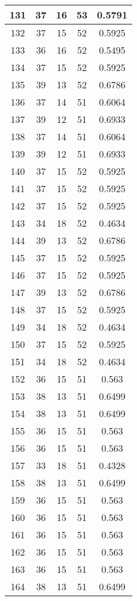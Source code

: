 \documentclass[letterpaper, 12pt]{article}
\begin{document}
\begin{longtable}{|c|c|c|c|c|}
\hline
131 & 37 & 16 & 53 & 0.5791 \\
\hline
132 & 37 & 15 & 52 & 0.5925 \\
\hline
133 & 36 & 16 & 52 & 0.5495 \\
\hline
134 & 37 & 15 & 52 & 0.5925 \\
\hline
135 & 39 & 13 & 52 & 0.6786 \\
\hline
136 & 37 & 14 & 51 & 0.6064 \\
\hline
137 & 39 & 12 & 51 & 0.6933 \\
\hline
138 & 37 & 14 & 51 & 0.6064 \\
\hline
139 & 39 & 12 & 51 & 0.6933 \\
\hline
140 & 37 & 15 & 52 & 0.5925 \\
\hline
141 & 37 & 15 & 52 & 0.5925 \\
\hline
142 & 37 & 15 & 52 & 0.5925 \\
\hline
143 & 34 & 18 & 52 & 0.4634 \\
\hline
144 & 39 & 13 & 52 & 0.6786 \\
\hline
145 & 37 & 15 & 52 & 0.5925 \\
\hline
146 & 37 & 15 & 52 & 0.5925 \\
\hline
147 & 39 & 13 & 52 & 0.6786 \\
\hline
148 & 37 & 15 & 52 & 0.5925 \\
\hline
149 & 34 & 18 & 52 & 0.4634 \\
\hline
150 & 37 & 15 & 52 & 0.5925 \\
\hline
151 & 34 & 18 & 52 & 0.4634 \\
\hline
152 & 36 & 15 & 51 & 0.563 \\
\hline
153 & 38 & 13 & 51 & 0.6499 \\
\hline
154 & 38 & 13 & 51 & 0.6499 \\
\hline
155 & 36 & 15 & 51 & 0.563 \\
\hline
156 & 36 & 15 & 51 & 0.563 \\
\hline
157 & 33 & 18 & 51 & 0.4328 \\
\hline
158 & 38 & 13 & 51 & 0.6499 \\
\hline
159 & 36 & 15 & 51 & 0.563 \\
\hline
160 & 36 & 15 & 51 & 0.563 \\
\hline
161 & 36 & 15 & 51 & 0.563 \\
\hline
162 & 36 & 15 & 51 & 0.563 \\
\hline
163 & 36 & 15 & 51 & 0.563 \\
\hline
164 & 38 & 13 & 51 & 0.6499 \\

\end{longtable}
\end{document}
